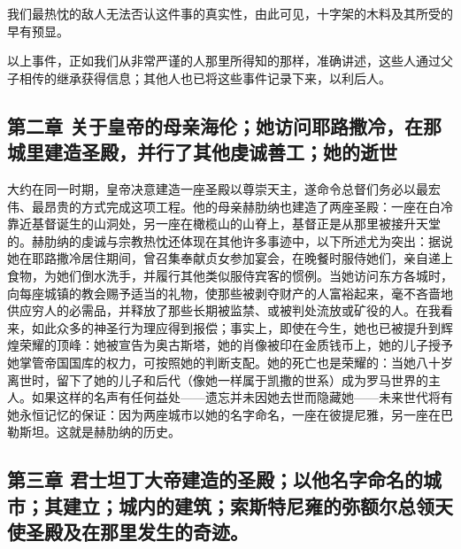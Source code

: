 \par

我们最热忱的敌人无法否认这件事的真实性，由此可见，十字架的木料及其所受的早有预显。\par

以上事件，正如我们从非常严谨的人那里所得知的那样，准确讲述，这些人通过父子相传的继承获得信息；其他人也已将这些事件记录下来，以利后人。\par


\subsection{第二章 关于皇帝的母亲海伦；她访问耶路撒冷，在那城里建造圣殿，并行了其他虔诚善工；她的逝世}

大约在同一时期，皇帝决意建造一座圣殿以尊崇天主，遂命令总督们务必以最宏伟、最昂贵的方式完成这项工程。他的母亲赫肋纳也建造了两座圣殿：一座在白冷靠近基督诞生的山洞处，另一座在橄榄山的山脊上，基督正是从那里被接升天堂的。赫肋纳的虔诚与宗教热忱还体现在其他许多事迹中，以下所述尤为突出：据说她在耶路撒冷居住期间，曾召集奉献贞女参加宴会，在晚餐时服侍她们，亲自递上食物，为她们倒水洗手，并履行其他类似服侍宾客的惯例。当她访问东方各城时，向每座城镇的教会赐予适当的礼物，使那些被剥夺财产的人富裕起来，毫不吝啬地供应穷人的必需品，并释放了那些长期被监禁、或被判处流放或矿役的人。在我看来，如此众多的神圣行为理应得到报偿；事实上，即使在今生，她也已被提升到辉煌荣耀的顶峰：她被宣告为奥古斯塔，她的肖像被印在金质钱币上，她的儿子授予她掌管帝国国库的权力，可按照她的判断支配。她的死亡也是荣耀的：当她八十岁离世时，留下了她的儿子和后代（像她一样属于凯撒的世系）成为罗马世界的主人。如果这样的名声有任何益处——遗忘并未因她去世而隐藏她——未来世代将有她永恒记忆的保证：因为两座城市以她的名字命名，一座在彼提尼雅，另一座在巴勒斯坦。这就是赫肋纳的历史。\par


\subsection{第三章 君士坦丁大帝建造的圣殿；以他名字命名的城市；其建立；城内的建筑；索斯特尼雍的弥额尔总领天使圣殿及在那里发生的奇迹。}

